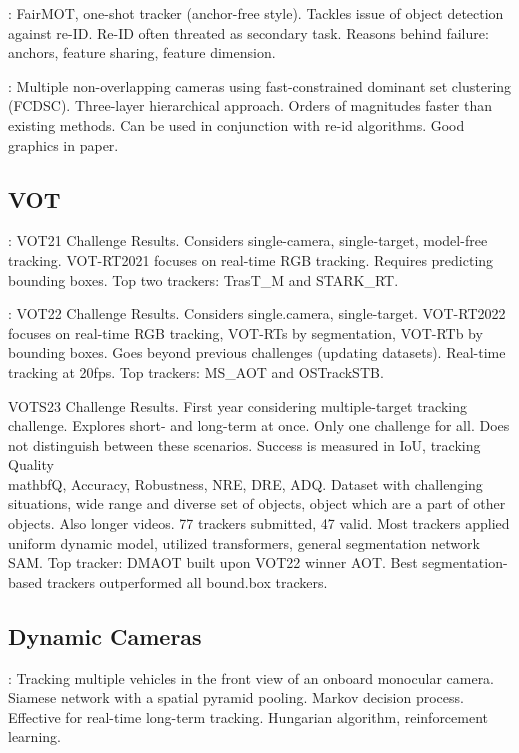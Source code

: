 \cite{Zhang21}: FairMOT, one-shot tracker (anchor-free style). Tackles issue of object detection against re-ID. Re-ID often threated as secondary task. Reasons behind failure: anchors, feature sharing, feature dimension.

\cite{Tesfaye19}: Multiple non-overlapping cameras using fast-constrained dominant set clustering (FCDSC). Three-layer hierarchical approach. Orders of magnitudes faster than existing methods. Can be used in conjunction with re-id algorithms. Good graphics in paper.

\subsection{VOT}

\cite{Kristan21}: VOT21 Challenge Results. Considers single-camera, single-target, model-free tracking. VOT-RT2021 focuses on real-time RGB tracking. Requires predicting bounding boxes. Top two trackers: TrasT\_M and STARK\_RT.

\cite{Kristan22}: VOT22 Challenge Results. Considers single.camera, single-target. VOT-RT2022 focuses on real-time RGB tracking, VOT-RTs by segmentation, VOT-RTb by bounding boxes. Goes beyond previous challenges (updating datasets). Real-time tracking at 20fps. Top trackers: MS\_AOT and OSTrackSTB.

\cite{Kristan23} VOTS23 Challenge Results. First year considering multiple-target tracking challenge. Explores short- and long-term at once. Only one challenge for all. Does not distinguish between these scenarios. Success is measured in IoU, tracking Quality \\mathbf{Q}, Accuracy, Robustness, NRE, DRE, ADQ. Dataset with challenging situations, wide range and diverse set of objects, object which are a part of other objects.  Also longer videos. 77 trackers submitted, 47 valid. Most trackers applied uniform dynamic model, utilized transformers, general segmentation network SAM. Top tracker: DMAOT built upon VOT22 winner AOT. Best segmentation-based trackers outperformed all bound.box trackers.

\subsection{Dynamic Cameras}

\cite{Zou19}: Tracking multiple vehicles in the front view of an onboard monocular camera. Siamese network with a spatial pyramid pooling. Markov decision process. Effective for real-time long-term tracking. Hungarian algorithm, reinforcement learning.

